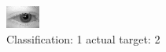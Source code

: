 \begin{figure}[h!]
\begin{center}
\includegraphics[width=0.60\columnwidth]{figures/ID415_class_1_target_2.png}
\end{center}
\caption{ Classification: 1 actual target: 2}
\label{fig:ID415_class_1_target_2}
\end{figure}
